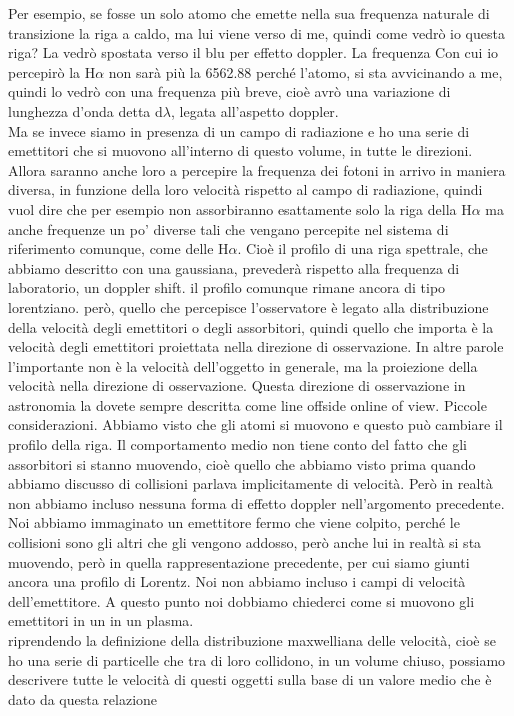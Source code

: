\documentclass[a4paper,11pt]{article}
\begin{document}
Per esempio, se fosse un solo atomo che emette nella sua frequenza naturale di transizione la riga a caldo, ma lui viene verso di me, quindi come vedrò io questa riga? La vedrò spostata verso il blu per effetto doppler. La frequenza Con cui io percepirò la H$\alpha$ non sarà più la 6562.88 perché l'atomo, si sta avvicinando a me, quindi lo vedrò con una frequenza più breve, cioè avrò una variazione di lunghezza d'onda detta d$\lambda$, legata all'aspetto doppler. 
\\Ma se invece siamo in presenza di un campo di radiazione e ho una serie di emettitori che si muovono all'interno di questo volume, in tutte le direzioni. Allora saranno anche loro a percepire la frequenza dei fotoni in arrivo in maniera diversa, in funzione della loro velocità rispetto al campo di radiazione, quindi vuol dire che per esempio non assorbiranno esattamente solo la riga della H$\alpha$ ma anche frequenze un po’ diverse tali che vengano percepite nel sistema di riferimento comunque, come delle H$\alpha$.
Cioè il profilo di una riga spettrale, che abbiamo descritto con una gaussiana, prevederà rispetto alla frequenza di laboratorio, un doppler shift. 
il profilo comunque rimane ancora di tipo lorentziano. 
però, quello che percepisce l'osservatore è legato alla distribuzione della velocità degli emettitori o degli assorbitori, quindi quello che importa è la velocità degli emettitori proiettata nella direzione di osservazione. In altre parole l'importante non è la velocità dell'oggetto in generale, ma la proiezione della velocità nella direzione di osservazione. 
Questa direzione di osservazione in astronomia la dovete sempre descritta come line offside online of view. 
Piccole considerazioni. Abbiamo visto che gli atomi si muovono e questo può cambiare il profilo della riga. Il comportamento medio non tiene conto del fatto che gli assorbitori si stanno muovendo, cioè quello che abbiamo visto prima quando abbiamo discusso di collisioni parlava implicitamente di velocità. Però in realtà non abbiamo incluso nessuna forma di effetto doppler nell’argomento precedente. Noi abbiamo immaginato un emettitore fermo che viene colpito, perché le collisioni sono gli altri che gli vengono addosso, però anche lui in realtà si sta muovendo, però in quella rappresentazione precedente, per cui siamo giunti ancora una profilo di Lorentz. Noi non abbiamo incluso i campi di velocità dell'emettitore. 
A questo punto noi dobbiamo chiederci come si muovono gli emettitori in un in un plasma.
\\ riprendendo la definizione della distribuzione maxwelliana delle velocità, cioè se ho una serie di particelle che tra di loro collidono, in un volume chiuso, possiamo descrivere tutte le velocità di questi oggetti sulla base di un valore medio che è dato da questa relazione
\end{document}
